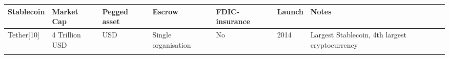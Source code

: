 \documentclass[english,]{IEEEtran}
\begin{document}
\begin{longtable}[]{@{}lllllll@{}}
\toprule
\begin{minipage}[b]{0.14\columnwidth}\raggedright\strut
Stablecoin\strut
\end{minipage} & \begin{minipage}[b]{0.08\columnwidth}\raggedright\strut
Market Cap\strut
\end{minipage} & \begin{minipage}[b]{0.08\columnwidth}\raggedright\strut
Pegged asset\strut
\end{minipage} & \begin{minipage}[b]{0.10\columnwidth}\raggedright\strut
Escrow\strut
\end{minipage} & \begin{minipage}[b]{0.08\columnwidth}\raggedright\strut
FDIC-insurance\strut
\end{minipage} & \begin{minipage}[b]{0.04\columnwidth}\raggedright\strut
Launch\strut
\end{minipage} & \begin{minipage}[b]{0.30\columnwidth}\raggedright\strut
Notes\strut
\end{minipage}\tabularnewline
\midrule
\endhead
\begin{minipage}[t]{0.14\columnwidth}\raggedright\strut
Tether{[}10{]}\strut
\end{minipage} & \begin{minipage}[t]{0.08\columnwidth}\raggedright\strut
4 Trillion USD\strut
\end{minipage} & \begin{minipage}[t]{0.08\columnwidth}\raggedright\strut
USD\strut
\end{minipage} & \begin{minipage}[t]{0.10\columnwidth}\raggedright\strut
Single organisation\strut
\end{minipage} & \begin{minipage}[t]{0.08\columnwidth}\raggedright\strut
No\strut
\end{minipage} & \begin{minipage}[t]{0.04\columnwidth}\raggedright\strut
2014\strut
\end{minipage} & \begin{minipage}[t]{0.30\columnwidth}\raggedright\strut
Largest Stablecoin, 4th largest cryptocurrency\strut
\end{minipage}\tabularnewline
\begin{minipage}[t]{0.14\columnwidth}\raggedright\strut

\end{minipage}
\end{longtable}
\end{document}
